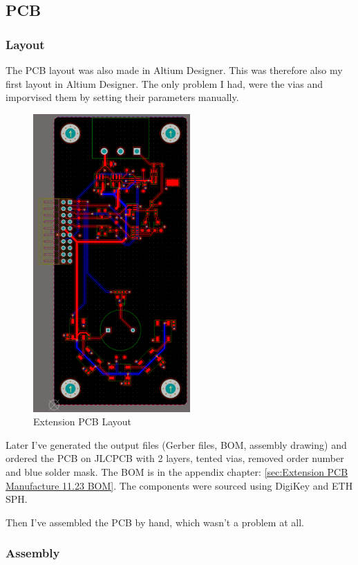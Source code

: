 \newpage
\subsection{PCB}
\subsubsection{Layout}

The PCB layout was also made in Altium Designer. This was therefore also my first layout in Altium Designer. The only problem I had, were the vias and imporvised them by setting their parameters manually. 

\begin{figure}[H]
	\centering
	\includegraphics[width=6cm, page=2]{Resources/PCB_LAyout.png}
	\caption{Extension PCB Layout}
	\label{fig:Extension PCB Layout}
\end{figure}

Later I've generated the output files (Gerber files, BOM, assembly drawing) and ordered the PCB on JLCPCB with 2 layers, tented vias, removed order number and blue solder mask. The BOM is in the appendix chapter: \ref{sec:Extension PCB Manufacture 11.23 BOM}. The components were sourced using DigiKey and ETH SPH.


Then I've assembled the PCB by hand, which wasn't a problem at all.

\subsubsection{Assembly}

